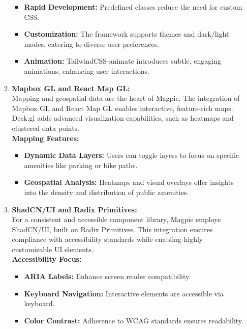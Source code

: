 \begin{enumerate}
\begin{enumerate}
\begin{itemize}
            \item \textbf{Rapid Development:}  Predefined classes reduce the need for custom CSS.
            \item \textbf{Customization:}  The framework supports themes and dark/light modes, catering to diverse user preferences.
            \item \textbf{Animation:}  TailwindCSS-animate introduces subtle, engaging animations, enhancing user interactions.
        \end{itemize}
        \item \textbf{Mapbox GL and React Map GL:} \\
        Mapping and geospatial data are the heart of Magpie. The integration of Mapbox GL and React Map GL enables interactive, feature-rich maps. Deck.gl adds advanced visualization capabilities, such as heatmaps and clustered data points.\\
        \textbf{Mapping Features:}
        \begin{itemize}
                \item \textbf{Dynamic Data Layers:} Users can toggle layers to focus on specific amenities like parking or bike paths.
                \item \textbf{Geospatial Analysis:} Heatmaps and visual overlays offer insights into the density and distribution of public amenities.
        \end{itemize}
        \item \textbf{ShadCN/UI and Radix Primitives:} \\
        For a consistent and accessible component library, Magpie employs ShadCN/UI, built on Radix Primitives. This integration ensures compliance with accessibility standards while enabling highly customizable UI elements.\\
        \textbf{Accessibility Focus:}
        \begin{itemize}
            \item \textbf{ARIA Labels:} Enhance screen reader compatibility.
            \item \textbf{Keyboard Navigation:} Interactive elements are accessible via keyboard.
            \item \textbf{Color Contrast:} Adherence to WCAG standards ensures readability.
        \end{itemize}
    \end{enumerate}
    

\end{enumerate}